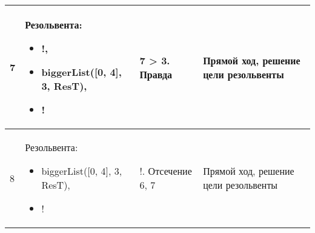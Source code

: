 \documentclass[14pt,a4paper]{scrreprt}
\begin{document}
\begin{table}[H]
\begin{tabular}{|p{0.8cm\small}|p{4.7cm\small}|p{5.7cm\small}|p{4cm\small}|}
		\hline
		7 & Резольвента: \begin{itemize} \item !, \item biggerList([0, 4], 3, ResT), \item ! \end{itemize} & 7 > 3. Правда & Прямой ход, решение цели резольвенты\\
		\hline
		8 & Резольвента: \begin{itemize} \item biggerList([0, 4], 3, ResT), \item ! \end{itemize} & !. Отсечение 6, 7 & Прямой ход, решение цели резольвенты\\
		\hline
	\end{tabular}
\end{table}
\end{document}
